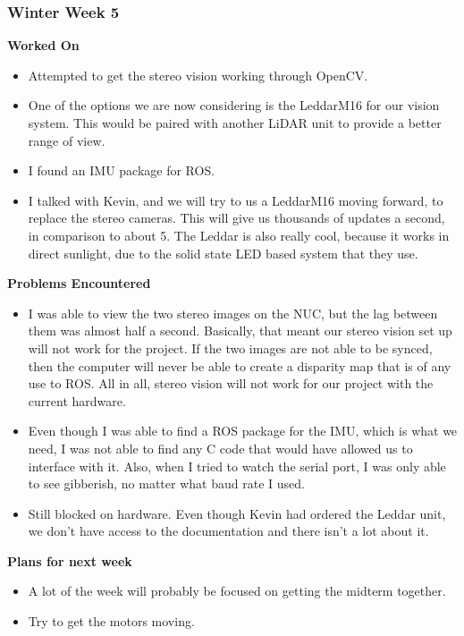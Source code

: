 \documentclass[compsoc,draftclsnofoot,onecolumn,10pt]{IEEEtran}
\begin{document}
\subsubsection*{Winter Week 5}
\textbf{Worked On}
\begin{itemize}
    \item Attempted to get the stereo vision working through OpenCV. 
    \item One of the options we are now considering is the LeddarM16 for our vision system. 
    This would be paired with another LiDAR unit to provide a better range of view.
    \item I found an IMU package for ROS.
    \item I talked with Kevin, and we will try to us a LeddarM16 moving forward, to replace the stereo cameras. This will give us thousands of updates a second, in comparison to about 5. The Leddar is also really cool, because it works in direct sunlight, due to the solid state LED based system that they use. 
\end{itemize}
\textbf{Problems Encountered}
\begin{itemize}
    \item I was able to view the two stereo images on the NUC, but the lag between them was almost half a second. 
    Basically, that meant our stereo vision set up will not work for the project. If the two images are not able to be synced, then the computer will never be able to create a disparity map that is of any use to ROS. All in all, stereo vision will not work for our project with the current hardware.
    \item Even though I was able to find a ROS package for the IMU, which is what we need, I was not able to find any C code that would have allowed us to interface with it. Also, when I tried to watch the serial port, I was only able to see gibberish, no matter what baud rate I used. 
    \item Still blocked on hardware. Even though Kevin had ordered the Leddar unit, we don't have access to the documentation and there isn't a lot about it.
\end{itemize}
\textbf{Plans for next week}
\begin{itemize}
    \item A lot of the week will probably be focused on getting the midterm together. 
    \item Try to get the motors moving. 
\end{itemize}
\end{document}
